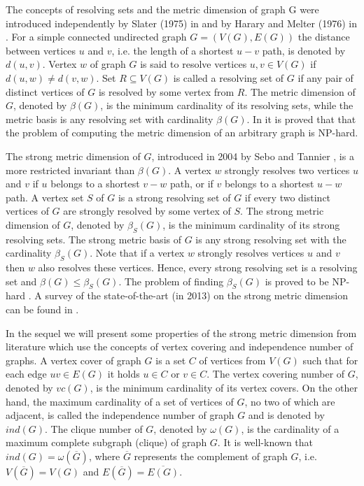 \documentclass[preprint,12pt]{elsarticle}
\begin{document}
The concepts of resolving sets and the metric dimension of graph G were introduced 
independently by Slater (1975) in \cite{metd1} and by Harary and Melter (1976) in \cite{metd2}. 
For a simple connected undirected graph $G = (V(G),E(G))$ the distance between vertices $u$ and
$v$, i.e. the length of a shortest $u-v$ path, is denoted by $d(u,v)$. 
Vertex $w$ of graph $G$ is said to resolve vertices $u,v \in  V(G)$ if $d(u,w) \ne d(v,w)$. 
Set $R \subseteq V(G)$ is called a resolving set of $G$ if any pair of distinct vertices of $G$ 
is resolved by some vertex from $R$. The metric dimension of $G$, denoted by $\beta(G)$, 
is the minimum cardinality of its resolving sets, while the metric basis is any resolving set 
with cardinality $\beta(G)$. In \cite{metd3} it is proved that that the problem of computing 
the metric dimension of an arbitrary graph is NP-hard. 

The strong metric dimension of $G$, introduced in 2004 by Sebo and Tannier \cite{smetd1}, 
is a more restricted invariant than $\beta(G)$. A vertex $w$ strongly resolves two vertices 
$u$ and $v$ if $u$ belongs to a shortest $v-w$ path, or if $v$ belongs to a shortest $u-w$ path. 
A vertex set $S$ of $G$ is a strong resolving set of $G$ if every two distinct vertices of $G$ 
are strongly resolved by some vertex of $S$. The strong metric dimension of $G$, 
denoted by $\beta_S(G)$, is the minimum cardinality of its strong resolving sets. 
The strong metric basis of $G$ is any strong resolving set with the cardinality $\beta_S(G)$. 
Note that if a vertex $w$ strongly resolves vertices $u$ and $v$ then $w$ also resolves these vertices. 
Hence, every strong resolving set is a resolving set and $\beta(G) \le \beta_S(G)$. 
The problem of finding $\beta_S(G)$ is proved to be NP-hard \cite{smetd2}. 
A survey of the state-of-the-art (in 2013) on the strong metric dimension can be found in \cite{yuj}. 

In the sequel we will present some properties of the strong metric dimension from literature which use the concepts 
of vertex covering and independence number of graphs. A vertex cover of graph $G$ is a set $C$ 
of vertices from $V(G)$ such that for each edge $uv \in E(G)$ it holds $u \in C$ or $v \in C$.
The vertex covering number of $G$, denoted by $vc(G)$, is the minimum cardinality of its vertex covers. 
On the other hand, the maximum cardinality of a set of vertices of $G$, no two of which are adjacent, is called
the independence number of graph $G$ and is denoted by $ind(G)$. The clique number of $G$, denoted by $\omega(G)$,
is the cardinality of a maximum complete subgraph (clique) of graph $G$. It is well-known that $ind(G) = \omega(\overline{G})$,
where $\overline{G}$ represents the complement of graph $G$, i.e. $V(\overline{G}) = V(G)$ and 
$E(\overline{G}) = \overline{E(G)}$.
\end{document}
